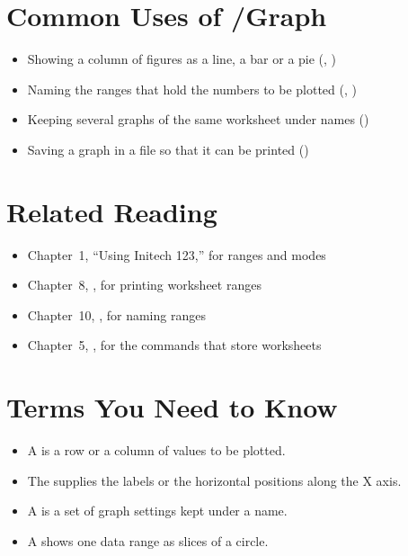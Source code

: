\section{Common Uses of /Graph}
\begin{itemize}
\item Showing a column of figures as a line, a bar or a pie (, ) 
\item Naming the ranges that hold the numbers to be plotted (, ) 
\item Keeping several graphs of the same worksheet under names () 
\item Saving a graph in a file so that it can be printed () 
\end{itemize}

\section{Related Reading}
\begin{itemize}
\item Chapter~1, ``Using Initech 123,'' for ranges and modes
\item Chapter~8, , for printing worksheet ranges
\item Chapter~10, , for naming ranges
\item Chapter~5, , for the commands that store worksheets
\end{itemize}

\section{Terms You Need to Know}
\begin{itemize}
\item A  is a row or a column of values to be plotted.
\item The  supplies the labels or the horizontal positions along the X axis.
\item A  is a set of graph settings kept under a name.
\item A  shows one data range as slices of a circle.
\end{itemize}

